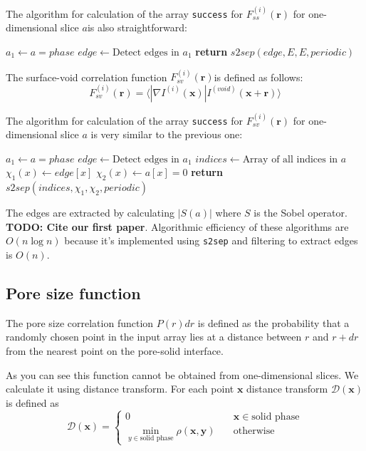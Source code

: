 \documentclass[reprint,amsmath,amssymb,aps,pre,showkeys,showpacs,nofootinbib]{revtex4-1}
\newcommand{\code}[1]{\colorbox{light-gray}{\texttt{#1}}}
\begin{document}
The algorithm for calculation of the array \code{success} for
$F_{ss}^{(i)}(\bm{r})$ for one-dimensional slice $a$is also straightforward:
\begin{algorithmic}[1]
    \State $a_1 \gets a = phase$
    \State $edge \gets \text{Detect edges in $a_1$}$
    \State \textbf{return} $s2sep(edge, E, E, periodic)$
  \EndProcedure
\end{algorithmic}

The surface-void correlation function $F_{sv}^{(i)}(\bm{r})$is defined as
follows:
\begin{equation*}
  F_{sv}^{(i)}(\bm{r}) = \langle |\nabla I^{(i)}(\bm{x})| I^{(void)}(\bm{x}
  + \bm{r}) \rangle
\end{equation*}

The algorithm for calculation of the array \code{success} for
$F_{sv}^{(i)}(\bm{r})$ for one-dimensional slice $a$ is very similar to the
previous one:
\begin{algorithmic}[1]
    \State $a_1 \gets a = phase$
    \State $edge \gets \text{Detect edges in $a_1$}$
    \State $indices \gets \text{Array of all indices in $a$}$
    \State $\chi_1(x) \gets edge[x]$
    \State $\chi_2(x) \gets a[x] = 0$ 
    \State \textbf{return} $s2sep(indices, \chi_1, \chi_2, periodic)$
  \EndProcedure
\end{algorithmic}

The edges are extracted by calculating $|S(a)|$ where $S$ is the Sobel
operator. \textbf{TODO: Cite our first paper}. Algorithmic efficiency of these
algorithms are $O(n\log n)$ because it's implemented using \code{s2sep} and
filtering to extract edges is $O(n)$.

\subsection{Pore size function}
The pore size correlation function $P(r)dr$ is defined as the probability that a
randomly chosen point in the input array lies at a distance between
$r$ and $r + dr$ from the nearest point on the pore-solid interface.

As you can see this function cannot be obtained from one-dimensional slices. We
calculate it using distance transform. For each point $\bm{x}$ distance
transform $\mathcal{D}(\bm{x})$ is defined as
\begin{equation*}
  \mathcal{D}(\bm{x})= \left\{
  \begin{array}{ll}
    0 & \quad \bm{x} \in \text{solid phase} \\
    \min\limits_{y \in \text{solid phase}} \rho(\bm{x},\bm{y}) & \quad \text{otherwise}
  \end{array}
\right.
\end{equation*}
\end{document}
